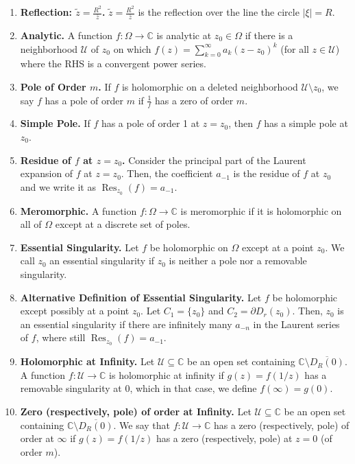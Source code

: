 \documentclass[11pt]{article}
\theoremstyle{definition}
\theoremstyle{named}
\DeclareMathOperator{\Res}{Res}
\begin{document}
\begin{enumerate}
    \item \textbf{Reflection: $\tilde{z} = \frac{R^2}{\overline{z}}$. } $\tilde{z} = \frac{R^2}{\overline{z}}$ is the reflection over the line the circle $|\xi| = R$. 
    \item \textbf{Analytic. } A function $f: \Omega \to \mathbb{C}$ is analytic at $z_0 \in \Omega$ if there is a neighborhood $\mathcal{U}$ of $z_0$ on which $f(z) = \sum_{k=0}^{\infty} a_k(z-z_0)^k$ (for all $z \in \mathcal{U}$) where the RHS is a convergent power series. 
    \item \textbf{Pole of Order $m$. } If $f$ is holomorphic on a deleted neighborhood $\mathcal{U} \setminus {z_0}$, we say $f$ has a pole of order $m$ if $\frac{1}{f}$ has a zero of order $m$. 
    \item \textbf{Simple Pole. } If $f$ has a pole of order 1 at $z=z_0$, then $f$ has a simple pole at $z_0$. 
    \item \textbf{Residue of $f$ at $z=z_0$. } Consider the principal part of the Laurent expansion of $f$ at $z=z_0$. Then, the coefficient $a_{-1}$ is the residue of $f$ at $z_0$ and we write it as $\Res_{z_0}(f) = a_{-1}$. 
    \item \textbf{Meromorphic. } A function $f: \Omega \to \mathbb{C}$ is meromorphic if it is holomorphic on all of $\Omega$ except at a discrete set of poles. 
    \item \textbf{Essential Singularity. } Let $f$ be holomorphic on $\Omega$ except at a point $z_0$. We call $z_0$ an essential singularity if $z_0$ is neither a pole nor a removable singularity. 
    \item \textbf{Alternative Definition of Essential Singularity. } Let $f$ be holomorphic except possibly at a point $z_0$. Let $C_1 = \{z_0\}$ and $C_2 = \partial D_r(z_0)$. Then, $z_0$ is an essential singularity if there are infinitely many $a_{-n}$ in the Laurent series of $f$, where still $\Res_{z_0}(f) = a_{-1}$. 
    \item \textbf{Holomorphic at Infinity. } Let $\mathcal{U} \subseteq \mathbb{C}$ be an open set containing $\mathbb{C} \setminus \overline{D_R(0)}$. A function $f: \mathcal{U} \to \mathbb{C}$ is holomorphic at infinity if $g(z) = f(1/z)$ has a removable singularity at 0, which in that case, we define $f(\infty) = g(0)$. 
    \item \textbf{Zero (respectively, pole) of order at Infinity. } Let $\mathcal{U} \subseteq \mathbb{C}$ be an open set containing $\mathbb{C} \setminus \overline{D_R(0)}$. We say that $f: \mathcal{U} \to \mathbb{C}$ has a zero (respectively, pole) of order at $\infty$ if $g(z) = f(1/z)$ has a zero (respectively, pole) at $z=0$ (of order $m$). 

\end{enumerate}
\end{document}
